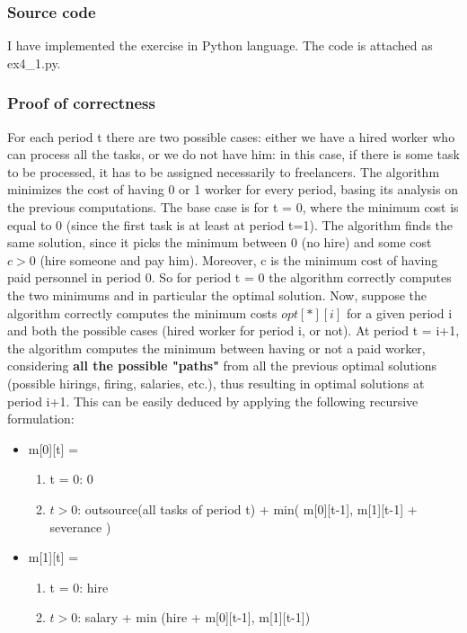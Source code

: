 \subsubsection{Source code}
I have implemented the exercise in Python language. The code is attached as ex4\_1.py.

\subsubsection{Proof of correctness}
For each period t there are two possible cases: either we have a hired worker who can process all the tasks, or we do not have him: in this case, if there is some task to be processed, it has to be assigned necessarily to freelancers. The algorithm minimizes the cost of having 0 or 1 worker for every period, basing its analysis on the previous computations. The base case is for t = 0, where the minimum cost is equal to 0 (since the first task is at least at period t=1). The algorithm finds the same solution, since it picks the minimum between 0 (no hire) and some cost $c > 0$ (hire someone and pay him). Moreover, c is the minimum cost of having paid personnel in period 0. So for period t = 0 the algorithm correctly computes the two minimums and in particular the optimal solution. Now, suppose the algorithm correctly computes the minimum costs $opt[*][i]$ for a given period i and both the possible cases (hired worker for period i, or not). At period t = i+1, the algorithm computes the minimum between having or not a paid worker, considering \textbf{all the possible "paths"} from all the previous optimal solutions (possible hirings, firing, salaries, etc.), thus resulting in optimal solutions at period i+1. This can be easily deduced by applying the following recursive formulation:
\begin{itemize}
	\item m[0][t] = 
	\begin{enumerate}
		\item t = 0: 0
		\item $t > 0$: outsource(all tasks of period t) + min( m[0][t-1], m[1][t-1] + severance )
	\end{enumerate}
	\item m[1][t] = 
	\begin{enumerate}
		\item t = 0: hire
		\item $t > 0$: salary + min (hire + m[0][t-1], m[1][t-1])
	\end{enumerate}
\end{itemize}
